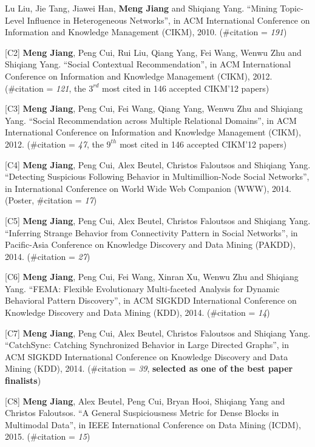\documentclass[margin, 10pt]{res}
\begin{document}
\begin{resume}
[C1] Lu Liu, Jie Tang, Jiawei Han, \textbf{Meng Jiang} and Shiqiang Yang. ``Mining Topic-Level Influence in Heterogeneous Networks'', in ACM International Conference on Information and Knowledge Management (CIKM), 2010. (\#citation = \textit{191})

[C2] \textbf{Meng Jiang}, Peng Cui, Rui Liu, Qiang Yang, Fei Wang, Wenwu Zhu and Shiqiang Yang. ``Social Contextual Recommendation'', in ACM International Conference on Information and Knowledge Management (CIKM), 2012. (\#citation = \textit{121}, the $3^{rd}$ most cited in 146 accepted CIKM'12 papers)

[C3] \textbf{Meng Jiang}, Peng Cui, Fei Wang, Qiang Yang, Wenwu Zhu and Shiqiang Yang. ``Social Recommendation across Multiple Relational Domains'', in ACM International Conference on Information and Knowledge Management (CIKM), 2012. (\#citation = \textit{47}, the $9^{th}$ most cited in 146 accepted CIKM'12 papers)

[C4] \textbf{Meng Jiang}, Peng Cui, Alex Beutel, Christos Faloutsos and Shiqiang Yang. ``Detecting Suspicious Following Behavior in Multimillion-Node Social Networks'', in International Conference on World Wide Web Companion (WWW), 2014. (Poster, \#citation = \textit{17})

[C5] \textbf{Meng Jiang}, Peng Cui, Alex Beutel, Christos Faloutsos and Shiqiang Yang. ``Inferring Strange Behavior from Connectivity Pattern in Social Networks'', in Pacific-Asia Conference on Knowledge Discovery and Data Mining (PAKDD), 2014. (\#citation = \textit{27})

[C6] \textbf{Meng Jiang}, Peng Cui, Fei Wang, Xinran Xu, Wenwu Zhu and Shiqiang Yang. ``FEMA: Flexible Evolutionary Multi-faceted Analysis for Dynamic Behavioral Pattern Discovery'', in ACM SIGKDD International Conference on Knowledge Discovery and Data Mining (KDD), 2014. (\#citation = \textit{14})

[C7] \textbf{Meng Jiang}, Peng Cui, Alex Beutel, Christos Faloutsos and Shiqiang Yang. ``CatchSync: Catching Synchronized Behavior in Large Directed Graphs'', in ACM SIGKDD International Conference on Knowledge Discovery and Data Mining (KDD), 2014. (\#citation = \textit{39}, \textbf{selected as one of the best paper finalists})

[C8] \textbf{Meng Jiang}, Alex Beutel, Peng Cui, Bryan Hooi, Shiqiang Yang and Christos Faloutsos. ``A General Suspiciousness Metric for Dense Blocks in Multimodal Data'', in IEEE International Conference on Data Mining (ICDM), 2015. (\#citation = \textit{15})


\end{resume}
\end{document}
